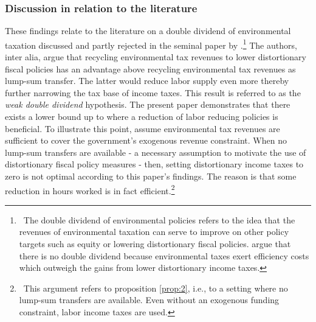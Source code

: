 \subsubsection{Discussion in relation to the literature}
These findings relate to the literature on a double dividend of environmental taxation discussed and partly rejected in the seminal paper by \cite{LansBovenberg1994EnvironmentalTaxation}.\footnote{ \ The double dividend of environmental policies refers to the idea that the revenues of environmental taxation can serve to improve on other policy targets such as equity or lowering distortionary fiscal policies. \cite{LansBovenberg1994EnvironmentalTaxation} argue that there is no double dividend because environmental taxes exert efficiency costs which outweigh the gains from lower distortionary income taxes. } The authors, inter alia, argue that recycling environmental tax revenues to lower distortionary fiscal policies has an advantage above recycling environmental tax revenues as lump-sum transfer. The latter would reduce labor supply even more thereby further narrowing the tax base of income taxes.  This result is referred to as the \textit{weak double dividend} hypothesis. The present paper demonstrates that there exists a lower bound up to where a reduction of labor reducing policies is beneficial. To illustrate this point, assume environmental tax revenues are sufficient to cover the government's exogenous revenue constraint. When no lump-sum transfers are available - a necessary assumption to motivate the use of distortionary fiscal policy measures - then, setting distortionary income taxes to zero is not optimal according to this paper's findings. The reason is that some reduction in hours worked is in fact efficient.\footnote{\ This argument refers to proposition \ref{prop:2}, i.e., to a setting where no lump-sum transfers are available. Even without an exogenous funding constraint, labor income taxes are used.}  %
  
